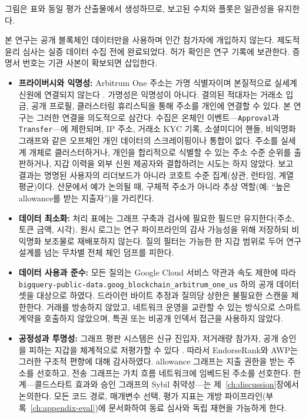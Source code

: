 그림은 표와 동일 평가 산출물에서 생성하므로, 보고된 수치와 플롯은 일관성을 유지한다.


본 연구는 공개 블록체인 데이터만을 사용하며 인간 참가자에 개입하지 않는다. 제도적 윤리 심사는 실증 데이터 수집 전에 완료되었다. 허가 확인은 연구 기록에 보관한다. 증명서 번호는 기관 사본이 확보되면 삽입한다.

\begin{itemize}
\item{}\label{sub:privacy-anonymity}
  \textbf{프라이버시와 익명성:} Arbitrum One 주소는 가명 식별자이며 본질적으로 실세계 신원에 연결되지 않는다 . 가명성은 익명성이 아니다. 결의된 적대자는 거래소 입금, 공개 프로필, 클러스터링 휴리스틱을 통해 주소를 개인에 연결할 수 있다. 본 연구는 그러한 연결을 의도적으로 삼간다. 수집은 온체인 이벤트---\texttt{Approval}과 \texttt{Transfer}---에 제한되며, IP 주소, 거래소 KYC 기록, 소셜미디어 핸들, 비익명화 그래프와 같은 오프체인 개인 데이터의 스크레이핑이나 통합이 없다. 주소를 실세계 개체로 클러스터하거나, 개인을 합리적으로 식별할 수 있는 주소 수준 순위를 출판하거나, 지갑 이력을 외부 신원 제공자와 결합하려는 시도는 하지 않았다. 보고 결과는 명명된 사용자의 리더보드가 아니라 코호트 수준 집계(상관, 런타임, 계열 평균)이다. 산문에서 예가 논의될 때, 구체적 주소가 아니라 추상 역할(예: ``높은 allowance를 받는 지출자'')을 가리킨다.


\item{}\label{sub:data-minimization}
  \textbf{데이터 최소화:} 처리 표에는 그래프 구축과 검사에 필요한 필드만 유지한다(주소, 토큰 금액, 시각). 원시 로그는 연구 파이프라인의 감사 가능성을 위해 저장하되 비익명화 보조물로 재배포하지 않는다. 질의 필터는 가능한 한 지갑 범위로 두어 연구 설계를 넘는 무차별 전체 체인 덤프를 피한다.


\item{}\label{sub:data-usage-compliance}
  \textbf{데이터 사용과 준수:} 모든 질의는 Google Cloud 서비스 약관과 속도 제한에 따라 \texttt{bigquery-public-data.goog\_blockchain\_arbitrum\_one\_us} 하의 공개 데이터셋을 대상으로 하였다. 드라이런 바이트 추정과 질의당 상한은 불필요한 스캔을 제한한다. 거래를 방송하지 않았고, 네트워크 운영을 교란할 수 있는 방식으로 스마트 계약을 호출하지 않았으며, 특권 또는 비공개 인덱서 접근을 사용하지 않았다.


\item{}\label{sub:fairness-transparency}
  \textbf{공정성과 투명성:} 그래프 평판 시스템은 신규 진입자, 저거래량 참가자, 공개 승인을 피하는 지갑을 체계적으로 저평가할 수 있다 . 따라서 EndorseRank와 AWP는 그러한 구조적 편향에 대해 감사하였다. allowance 그래프는 지출 권한을 받는 주소를 선호하고, 전송 그래프는 가치 흐름 네트워크에 임베드된 주소를 선호한다. 한계---콜드스타트 효과와 승인 그래프의 Sybil 취약성---는 제~\ref{ch:discussion}장에서 논의한다. 모든 코드 경로, 매개변수 선택, 평가 지표는 개방 파이프라인(부록~\ref{ch:appendix-eval})에 문서화하여 동료 심사와 독립 재현을 가능하게 한다.



\end{itemize}
